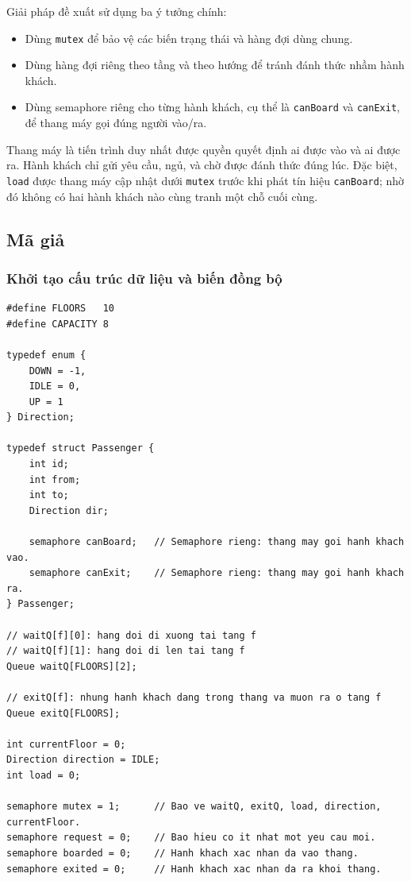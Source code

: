 Giải pháp đề xuất sử dụng ba ý tưởng chính:

\begin{itemize}
    \item Dùng \texttt{mutex} để bảo vệ các biến trạng thái và hàng đợi
    dùng chung.
    \item Dùng hàng đợi riêng theo tầng và theo hướng để tránh đánh thức
    nhầm hành khách.
    \item Dùng semaphore riêng cho từng hành khách, cụ thể là
    \texttt{canBoard} và \texttt{canExit}, để thang máy gọi đúng người
    vào/ra.
\end{itemize}

Thang máy là tiến trình duy nhất được quyền quyết định ai được vào và ai
được ra. Hành khách chỉ gửi yêu cầu, ngủ, và chờ được đánh thức đúng lúc.
Đặc biệt, \texttt{load} được thang máy cập nhật dưới \texttt{mutex} trước
khi phát tín hiệu \texttt{canBoard}; nhờ đó không có hai hành khách nào
cùng tranh một chỗ cuối cùng.

\subsection{Mã giả}

\subsubsection*{Khởi tạo cấu trúc dữ liệu và biến đồng bộ}

\begin{lstlisting}
#define FLOORS   10
#define CAPACITY 8

typedef enum {
    DOWN = -1,
    IDLE = 0,
    UP = 1
} Direction;

typedef struct Passenger {
    int id;
    int from;
    int to;
    Direction dir;

    semaphore canBoard;   // Semaphore rieng: thang may goi hanh khach vao.
    semaphore canExit;    // Semaphore rieng: thang may goi hanh khach ra.
} Passenger;

// waitQ[f][0]: hang doi di xuong tai tang f
// waitQ[f][1]: hang doi di len tai tang f
Queue waitQ[FLOORS][2];

// exitQ[f]: nhung hanh khach dang trong thang va muon ra o tang f
Queue exitQ[FLOORS];

int currentFloor = 0;
Direction direction = IDLE;
int load = 0;

semaphore mutex = 1;      // Bao ve waitQ, exitQ, load, direction, currentFloor.
semaphore request = 0;    // Bao hieu co it nhat mot yeu cau moi.
semaphore boarded = 0;    // Hanh khach xac nhan da vao thang.
semaphore exited = 0;     // Hanh khach xac nhan da ra khoi thang.
\end{lstlisting}

